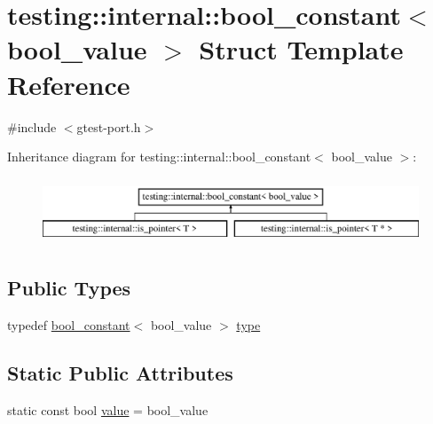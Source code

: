 \hypertarget{structtesting_1_1internal_1_1bool__constant}{\section{testing\+:\+:internal\+:\+:bool\+\_\+constant$<$ bool\+\_\+value $>$ Struct Template Reference}
\label{structtesting_1_1internal_1_1bool__constant}
}


{\ttfamily \#include $<$gtest-\/port.\+h$>$}

Inheritance diagram for testing\+:\+:internal\+:\+:bool\+\_\+constant$<$ bool\+\_\+value $>$\+:\begin{figure}[H]
\begin{center}
\leavevmode
\includegraphics[height=2.000000cm]{structtesting_1_1internal_1_1bool__constant}
\end{center}
\end{figure}
\subsection*{Public Types}
\begin{DoxyCompactItemize}
\item 
typedef \hyperlink{structtesting_1_1internal_1_1bool__constant}{bool\+\_\+constant}$<$ bool\+\_\+value $>$ \hyperlink{structtesting_1_1internal_1_1bool__constant_aba6d09ecf7eecea6c93480f0d627a167}{type}
\end{DoxyCompactItemize}
\subsection*{Static Public Attributes}
\begin{DoxyCompactItemize}
\item 
static const bool \hyperlink{structtesting_1_1internal_1_1bool__constant_a499fba6576296b04d99690a486424b32}{value} = bool\+\_\+value
\end{DoxyCompactItemize}


